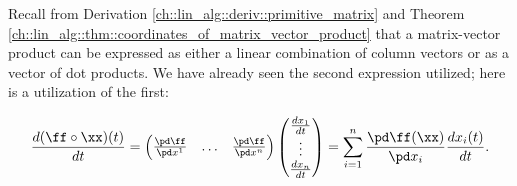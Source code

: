 \begin{lemma}
    Recall from Derivation \ref{ch::lin_alg::deriv::primitive_matrix} and Theorem \ref{ch::lin_alg::thm::coordinates_of_matrix_vector_product} that a matrix-vector product can be expressed as either a linear combination of column vectors or as a vector of dot products. We have already seen the second expression utilized; here is a utilization of the first:
    
    \begin{align*}
        \frac{d (\ff \circ \xx)(t)}{dt}
        =
        \begin{pmatrix}
            \frac{\pd \ff}{\pd x^1} & \hdots & \frac{\pd \ff}{\pd x^n}
        \end{pmatrix}
        \begin{pmatrix}
            \frac{dx_1}{dt} \\ \vdots \\ \frac{dx_n}{dt}
        \end{pmatrix}
        =
        \sum_{i = 1}^{n} \frac{\pd \ff(\xx)}{\pd x_i} \frac{d x_i(t)}{dt}.
    \end{align*}
\end{lemma}

